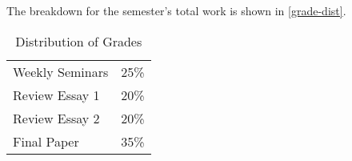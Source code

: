 \documentclass[titlepage]{article}
\newcommand\policy{../policy}
\begin{document}
The breakdown for the semester's total work is shown in
\autoref{grade-dist}.

\begin{table}[htbp]
  \centering
  {\lining
  \begin{tabular}{lr}
    \toprule
    Weekly Seminars & 25\% \\
    Review Essay 1  & 20\% \\
    Review Essay 2  & 20\% \\
    Final Paper     & 35\% \\
    \bottomrule
  \end{tabular}}
  \caption{Distribution of Grades}
  \label{grade-dist}
\end{table}



\end{document}
